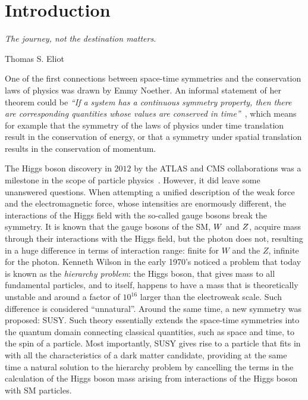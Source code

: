 \chapter*{Introduction}
\epigraph{\emph{The journey, not the destination matters.}}{Thomas S. Eliot}


One of the first connections between space-time symmetries and the conservation laws of physics was drawn by Emmy Noether. An informal statement of her theorem could be \emph{``If a system has a continuous symmetry property, then there are corresponding quantities whose values are conserved in time''}~\cite{thompson1994angular}, which means for example that the symmetry of the laws of physics under time translation result in the conservation of energy, or that a symmetry under spatial translation results in the conservation of momentum.

The Higgs boson discovery in $2012$ by the ATLAS and CMS collaborations was a milestone in the scope of particle physics~\cite{ATLASHiggs2012, CMSHiggs2012}. However, it did leave some unanswered questions. When attempting a unified description of the weak force and the electromagnetic force, whose intensities are enormously different, the interactions of the Higgs field with the so-called gauge bosons break the symmetry. It is known that the gauge bosons of the \ac{SM}, $W$ and $Z$, acquire mass through their interactions with the Higgs field, but the photon does not, resulting in a huge difference in terms of interaction range: finite for $W$ and the $Z$, infinite for the photon. Kenneth Wilson in the early 1970’s noticed a problem that today is known as the \emph{hierarchy problem}: the Higgs boson, that gives mass to all fundamental particles, and to itself, happens to have a mass that is theoretically unstable and around a factor of $10^{16}$ larger than the electroweak scale. Such difference is considered ``unnatural''. Around the same time, a new symmetry was proposed: \ac{SUSY}. Such theory essentially extends the space-time symmetries into the quantum domain connecting classical quantities, such as space and time, to the spin of a particle. Most importantly, \ac{SUSY} gives rise to a particle that fits in with all the characteristics of a dark matter candidate, providing at the same time a natural solution to the hierarchy problem by cancelling the terms in the calculation of the Higgs boson mass arising from interactions of the Higgs boson with \ac{SM} particles.

